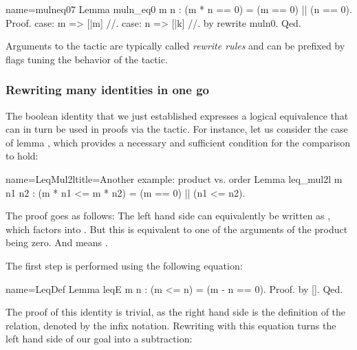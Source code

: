 \begin{coq}{name=mulneq07}{}
Lemma muln_eq0 m n : (m * n == 0) = (m == 0) || (n == 0).
Proof.
case: m => [|m] //.
case: n => [|k] //.
by rewrite muln0.
Qed.
\end{coq}

Arguments to the  tactic are typically called
\emph{rewrite rules} and can
be prefixed by flags tuning the behavior of the tactic.


\subsubsection{Rewriting many identities in one go}
\label{sec:multirew}

The boolean identity  that we just established expresses a
logical equivalence that can in turn be used in proofs via the
 tactic. For instance, let us consider the case of lemma
, which provides a necessary and sufficient condition
for the comparison  to hold:

\begin{coq}{name=LeqMul2l}{title=Another example: product vs. order}
Lemma leq_mul2l m n1 n2 : (m * n1 <= m * n2) = (m == 0) || (n1 <= n2).
\end{coq}

The proof goes as follows: The left
hand side can equivalently be written as , which
factors into . But this is equivalent to one
of the arguments of the product being zero. And 
means .

The first step is performed using the following equation:\label{leqE}

\begin{coq}{name=LeqDef}{}
Lemma leqE m n : (m <= n) = (m - n == 0).
Proof. by []. Qed.
\end{coq}

The proof of this identity is trivial, as the right hand side is the
definition of the  relation, denoted by the \C{<=} infix
notation. Rewriting with this equation turns the left hand side of our
goal into a subtraction:

